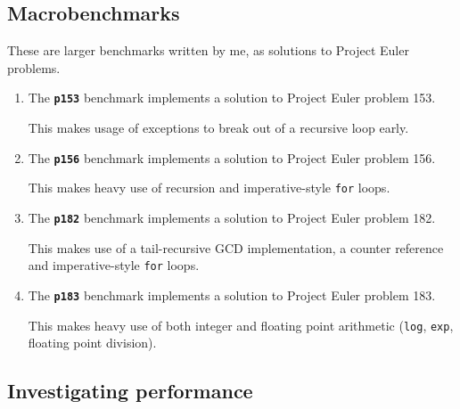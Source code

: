 \documentclass[12pt,a4paper,twoside,openright]{report}
\begin{document}
\subsection{Macrobenchmarks}
These are larger benchmarks written by me, as solutions to Project Euler problems.

\begin{enumerate}
\item

The \textbf{\texttt{p153}} benchmark implements a solution to Project Euler problem 153.

This makes usage of exceptions to break out of a recursive loop early.

\item
  The \textbf{\texttt{p156}} benchmark implements a solution to Project Euler problem 156.

This makes heavy use of recursion and imperative-style \lstinline!for! loops.

\item
  The \textbf{\texttt{p182}} benchmark implements a solution to Project Euler problem 182.

This makes use of a tail-recursive GCD implementation, a counter reference and imperative-style \lstinline!for! loops.

\item
  The \textbf{\texttt{p183}} benchmark implements a solution to Project Euler problem 183.

This makes heavy use of both integer and floating point arithmetic (\lstinline!log!, \lstinline!exp!, floating point division).
\end{enumerate}


\subsection{Investigating performance}
\end{document}
